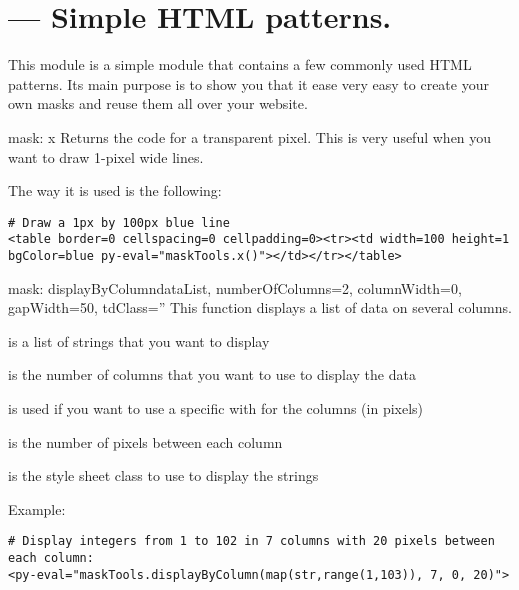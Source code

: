 \section{ --- Simple HTML patterns.}

This module is a simple module that contains a few commonly used HTML patterns. Its main purpose
is to show you that it ease very easy to create your own masks and reuse them all over your website.

\begin{funcdesc}{mask: x}{}
Returns the code for a transparent pixel. This is very useful when you want to draw 1-pixel wide lines.

The way it is used is the following:
\begin{verbatim}
# Draw a 1px by 100px blue line
<table border=0 cellspacing=0 cellpadding=0><tr><td width=100 height=1 bgColor=blue py-eval="maskTools.x()"></td></tr></table>
\end{verbatim}
\end{funcdesc}

\begin{funcdesc}{mask: displayByColumn}{dataList, numberOfColumns=2, columnWidth=0, gapWidth=50, tdClass=''}
This function displays a list of data on several columns.

 is a list of strings that you want to display

 is the number of columns that you want to use to display the data

 is used if you want to use a specific with for the columns (in pixels)

 is the number of pixels between each column

 is the style sheet class to use to display the strings

Example:
\begin{verbatim}
# Display integers from 1 to 102 in 7 columns with 20 pixels between each column:
<py-eval="maskTools.displayByColumn(map(str,range(1,103)), 7, 0, 20)">
\end{verbatim}
\end{funcdesc}

